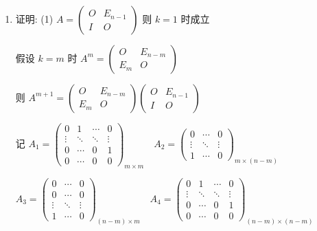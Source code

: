 	 \paragraph{} %
		 \begin{enumerate}
			 \item %
			       证明: (1) \( A = \begin{pmatrix}
				       O & E_{n-1} \\
				       I & O
			       \end{pmatrix} \) 则 \( k=1 \) 时成立

			       假设 \( k=m \) 时 \( A^{m} = \begin{pmatrix}
				       O     & E_{n-m} \\
				       E_{m} & O
			       \end{pmatrix} \)

			       则 \( A^{m+1} = \begin{pmatrix}
				       O     & E_{n-m} \\
				       E_{m} & O
			       \end{pmatrix} \begin{pmatrix}
				       O & E_{n-1} \\
				       I & O
			       \end{pmatrix} \)

			       记 \( A_{1} = \begin{pmatrix}
				       0      & 1      & \cdots & 0      \\
				       \vdots & \ddots & \ddots & \vdots \\
				       0      & \cdots & 0      & 1      \\
				       0      & \cdots & 0      & 0
			       \end{pmatrix}_{m \times m} \quad A_{2} = \begin{pmatrix}
				       0      & \cdots & 0      \\
				       \vdots & \ddots & \vdots \\
				       1      & \cdots & 0
			       \end{pmatrix}_{m \times (n-m)} \)

			       \( A_{3} = \begin{pmatrix}
				       0      & \cdots & 0      \\
				       0      & \cdots & 0      \\
				       \vdots & \ddots & \vdots \\
				       1      & \cdots & 0
			       \end{pmatrix}_{(n-m) \times m} \quad A_{4} = \begin{pmatrix}
				       0      & 1      & \cdots & 0      \\
				       \vdots & \ddots & \ddots & \vdots \\
				       0      & \cdots & 0      & 1      \\
				       0      & \cdots & 0      & 0
			       \end{pmatrix}_{(n-m) \times (n-m)} \)


\end{enumerate}
